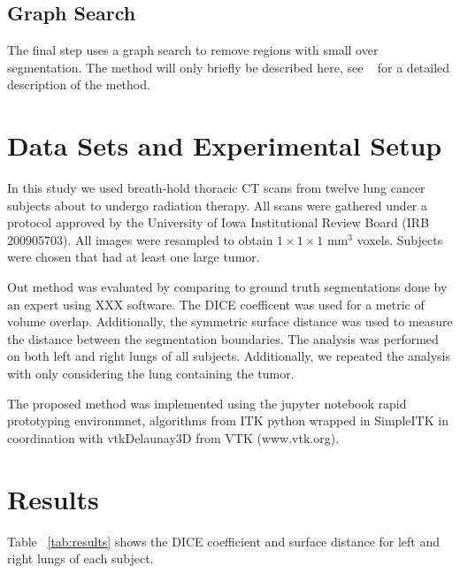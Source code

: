 \documentclass{llncs}
\begin{document}
\subsection{Graph Search}
%
The final step uses a graph search to remove regions with small over segmentation. The method will only briefly be described here, see ~\cite{li2006} for a detailed description of the method. 
%
\section{Data Sets and Experimental Setup}
%
In this study we used breath-hold thoracic CT scans from twelve lung cancer subjects about to undergo radiation therapy. All scans were gathered under a protocol approved by the University of Iowa Institutional Review Board (IRB 200905703). All images were resampled to obtain $1\times{}1\times{}1$ mm$^3$ voxels. Subjects were chosen that had at least one large tumor. 

Out method was evaluated by comparing to ground truth segmentations done by an expert using XXX software. The DICE coefficent was used for a metric of volume overlap. Additionally, the symmetric surface distance was used to measure the distance between the segmentation boundaries. The analysis was performed on both left and right lungs of all subjects. Additionally, we repeated the analysis with only considering the lung containing the tumor.


The proposed method was implemented using the jupyter notebook \cite{PER-GRA:2007} rapid prototyping environmnet,  algorithms from ITK\cite{johnson2015itk} python wrapped in SimpleITK \cite{10.3389/fninf.2013.00045} in coordination with vtkDelaunay3D from VTK (www.vtk.org).


%
\section{Results}
%
Table ~\ref{tab:results} shows the DICE coefficient and surface distance for left and right lungs of each subject. 

\newlength\intercol
\setlength\intercol{15pt}
\newlength\betweenwidth
\setlength\betweenwidth{10pt}
\newcommand\icspace{@{\hspace\intercol}}
\newcommand\inspace{@{\hspace\betweenwidth}}
\newcommand\MC[1]{\multicolumn{2}{c\icspace}{#1}}
\newcommand\MClast[1]{\multicolumn{2}{c}{#1}}
\end{document}
